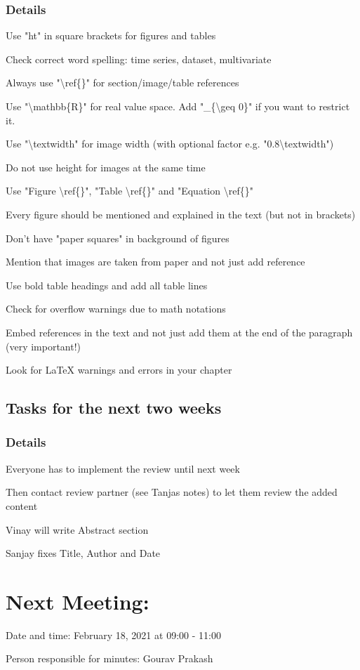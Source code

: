 \documentclass[11pt]{meetingmins} %
\begin{document}
\subsubsection{Details}
\begin{hiddensubitems}
    \item Use "ht" in square brackets for figures and tables
    \item Check correct word spelling: time series, dataset, multivariate
    \item Always use "\textbackslash ref\{\}" for section/image/table references
    \item Use "\textbackslash mathbb\{R\}" for real value space. Add "\_\{\textbackslash geq 0\}" if you want to restrict it.
    \item Use "\textbackslash textwidth" for image width (with optional factor e.g. "0.8\textbackslash textwidth")
    \item Do not use height for images at the same time
    \item Use "Figure \textbackslash ref\{\}", "Table \textbackslash ref\{\}" and "Equation \textbackslash ref\{\}"
    \item Every figure should be mentioned and explained in the text (but not in brackets)
    \item Don't have "paper squares" in background of figures
    \item Mention that images are taken from paper and not just add reference
    \item Use bold table headings and add all table lines
    \item Check for overflow warnings due to math notations
    \item Embed references in the text and not just add them at the end of the paragraph (very important!)
    \item Look for LaTeX warnings and errors in your chapter
\end{hiddensubitems}

\subsection{Tasks for the next two weeks}
\subsubsection{Details}
\begin{hiddensubitems}
    \item Everyone has to implement the review until next week
    \item Then contact review partner (see Tanjas notes) to let them review the added content
    \item Vinay will write Abstract section
    \item Sanjay fixes Title, Author and Date
\end{hiddensubitems}

\section{Next Meeting:}
\begin{hiddensubitems}
    \item
    Date and time: February 18, 2021 at 09:00 - 11:00
    \item
    Person responsible for minutes: Gourav Prakash
\end{hiddensubitems}
\end{document}
